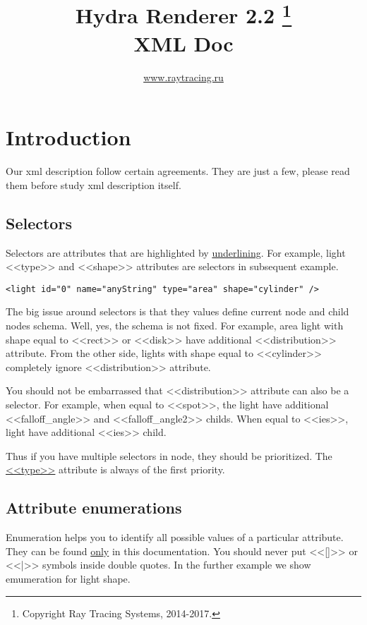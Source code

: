 \documentclass[a4paper,11pt]{report}
\title{\Huge \textbf{Hydra Renderer 2.2}  \footnote{ Copyright \space \textcopyright \space  Ray Tracing Systems, 2014-2017.} \\ \huge XML Doc }
\author{\url{www.raytracing.ru}}
\begin{document}
\maketitle

\chapter{Introduction}

Our xml description follow certain agreements. They are just a few, please read them before study xml description itself.

\section{Selectors}

Selectors are attributes that are highlighted by \underline{underlining}. For example, light <<type>> and <<shape>> attributes are selectors in subsequent example.

\lstset{language=XML}
\begin{lstlisting}
<light id="0" name="anyString" type="area" shape="cylinder" />
\end{lstlisting}

The big issue around selectors is that they values define current node and child nodes schema. Well, yes, the schema is not fixed. For example, area light with shape equal to <<rect>> or <<disk>> have additional <<distribution>> attribute. From the other side, lights with shape equal to <<cylinder>> completely ignore <<distribution>> attribute.

You should not be embarrassed that <<distribution>> attribute can also be a selector. For example, when equal to <<spot>>, the light have additional <<falloff\_angle>> and <<falloff\_angle2>> childs. When equal to <<ies>>, light have additional <<ies>> child.

Thus if you have multiple selectors in node, they should be prioritized. The \underline{<<type>>} attribute is always of the first priority. 

\section{Attribute enumerations}

Enumeration helps you to identify all possible values of a particular attribute. They can be found \underline{only} in this documentation. You should never put <<[]>> or <<|>> symbols inside double quotes. In the further example we show emumeration for light shape. 
\end{document}
